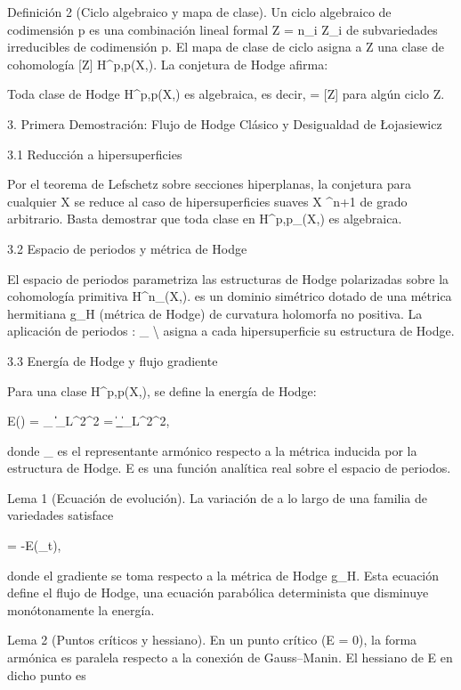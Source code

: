 \documentclass[12pt,a4paper]{book}
\begin{document}
Definición 2 (Ciclo algebraico y mapa de clase). Un ciclo algebraico de codimensión p es una combinación lineal formal Z = \sum n_i Z_i de subvariedades irreducibles de codimensión p. El mapa de clase de ciclo asigna a Z una clase de cohomología [Z] \in H^{p,p}(X,). La conjetura de Hodge afirma:

Toda clase de Hodge \alpha \in H^{p,p}(X,) es algebraica, es decir, \alpha = [Z] para algún ciclo Z.

3. Primera Demostración: Flujo de Hodge Clásico y Desigualdad de Łojasiewicz

3.1 Reducción a hipersuperficies

Por el teorema de Lefschetz sobre secciones hiperplanas, la conjetura para cualquier X se reduce al caso de hipersuperficies suaves X \subset {}^{n+1} de grado arbitrario. Basta demostrar que toda clase en H^{p,p}_{}(X,) es algebraica.

3.2 Espacio de periodos y métrica de Hodge

El espacio de periodos  parametriza las estructuras de Hodge polarizadas sobre la cohomología primitiva H^n_{}(X,).  es un dominio simétrico dotado de una métrica hermitiana g_H (métrica de Hodge) de curvatura holomorfa no positiva. La aplicación de periodos \Phi: _{} \to \Gamma\backslash{} asigna a cada hipersuperficie su estructura de Hodge.

3.3 Energía de Hodge y flujo gradiente

Para una clase \alpha \in H^{p,p}(X,), se define la energía de Hodge:

E(\alpha) = \inf_{\omega \in \alpha} \|\omega\|_{L^2}^2 = \|\omega_{}\|_{L^2}^2,

donde \omega_{} es el representante armónico respecto a la métrica inducida por la estructura de Hodge. E es una función analítica real sobre el espacio de periodos.

Lema 1 (Ecuación de evolución). La variación de \alpha a lo largo de una familia de variedades satisface

 = -\nabla E(\alpha_t),

donde el gradiente se toma respecto a la métrica de Hodge g_H. Esta ecuación define el flujo de Hodge, una ecuación parabólica determinista que disminuye monótonamente la energía.

Lema 2 (Puntos críticos y hessiano). En un punto crítico (\nabla E = 0), la forma armónica es paralela respecto a la conexión de Gauss–Manin. El hessiano de E en dicho punto es
\end{document}
